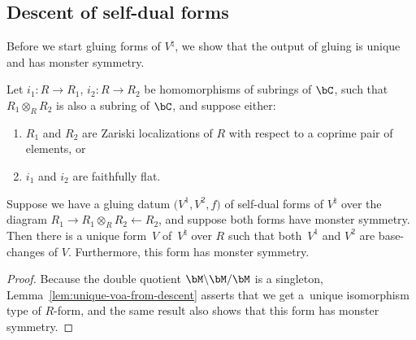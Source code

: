 \subsection{Descent of self-dual forms}

Before we start gluing forms of $V^\natural$, we show that the output of gluing is unique and has monster symmetry.

\begin{lem} \label{lem:unique-R-forms-of-moonshine-from-gluing-data}Let $i_1\colon R \to R_1$, $i_2\colon R \to R_2$ be homomorphisms of subrings of $\bC$, such that $R_1 \otimes_{R} R_2$ is also a subring of $\bC$, and suppose either:
\begin{enumerate}\itemsep=0pt
\item[$1)$] $R_1$ and $R_2$ are Zariski localizations of $R$ with respect to a coprime pair of elements, or
\item[$2)$] $i_1$ and $i_2$ are faithfully flat.
\end{enumerate}
Suppose we have a gluing datum $\big(V^1, V^2, f\big)$ of self-dual forms of $V^\natural$ over the diagram $R_1 \to R_1 \otimes_{R} R_2 \leftarrow R_2$, and suppose both forms have monster symmetry. Then there is a unique form~$V$ of~$V^\natural$ over $R$ such that both~$V^1$ and $V^2$ are base-changes of $V$. Furthermore, this form has monster symmetry.
\end{lem}
\begin{proof}Because the double quotient $\bM \backslash \bM / \bM$ is a singleton, Lemma~\ref{lem:unique-voa-from-descent} asserts that we get a~unique isomorphism type of $R$-form, and the same result also shows that this form has monster symmetry.
\end{proof}

